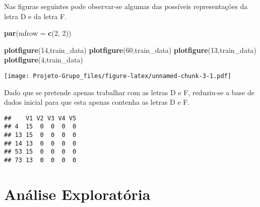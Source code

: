 \documentclass[
]{article}
\newenvironment{Shaded}{\begin{snugshade}}{\end{snugshade}}
\newcommand{\AttributeTok}[1]{\textcolor[rgb]{0.13,0.29,0.53}{#1}}
\newcommand{\DecValTok}[1]{\textcolor[rgb]{0.00,0.00,0.81}{#1}}
\newcommand{\FunctionTok}[1]{\textcolor[rgb]{0.13,0.29,0.53}{\textbf{#1}}}
\newcommand{\NormalTok}[1]{#1}
\newcommand{\OtherTok}[1]{\textcolor[rgb]{0.56,0.35,0.01}{#1}}
\newcommand{\SpecialCharTok}[1]{\textcolor[rgb]{0.81,0.36,0.00}{\textbf{#1}}}
\begin{document}
Nas figuras seguintes pode observar-se algumas das possíveis
representações da letra D e da letra F.

\begin{Shaded}
\begin{Highlighting}[]
\FunctionTok{par}\NormalTok{(}\AttributeTok{mfrow =} \FunctionTok{c}\NormalTok{(}\DecValTok{2}\NormalTok{, }\DecValTok{2}\NormalTok{))}

\FunctionTok{plotfigure}\NormalTok{(}\DecValTok{14}\NormalTok{,train\_data)}
\FunctionTok{plotfigure}\NormalTok{(}\DecValTok{60}\NormalTok{,train\_data)}
\FunctionTok{plotfigure}\NormalTok{(}\DecValTok{13}\NormalTok{,train\_data)}
\FunctionTok{plotfigure}\NormalTok{(}\DecValTok{4}\NormalTok{,train\_data)}
\end{Highlighting}
\end{Shaded}

\texttt{[image: Projeto-Grupo\_files/figure-latex/unnamed-chunk-3-1.pdf]}

Dado que se pretende apenas trabalhar com as letras D e F, reduziu-se a
base de dados inicial para que esta apenas contenha as letras D e F.

\begin{Shaded}
\end{Shaded}

\begin{verbatim}
##    V1 V2 V3 V4 V5
## 4  15  0  0  0  0
## 13 15  0  0  0  0
## 14 13  0  0  0  0
## 53 15  0  0  0  0
## 73 13  0  0  0  0
\end{verbatim}

\hypertarget{anuxe1lise-exploratuxf3ria}{%
\section{Análise Exploratória}\label{anuxe1lise-exploratuxf3ria}}
\end{document}
